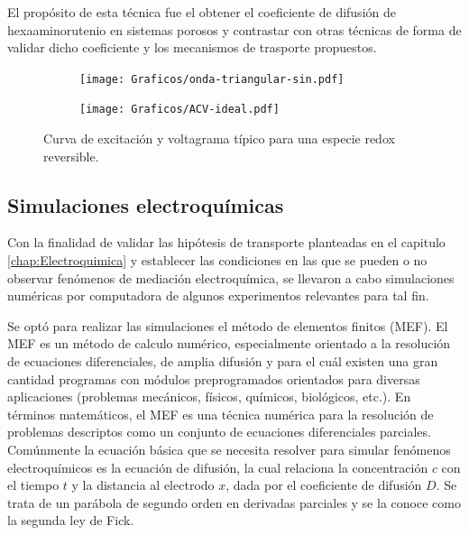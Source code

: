 	 		El propósito de esta técnica fue el obtener el coeficiente de difusión de hexaaminorutenio en sistemas porosos y contrastar con otras técnicas de forma de validar dicho coeficiente y los mecanismos de trasporte propuestos. 

	 			 \begin{figure}[hb!]
			  		  \begin{subfigure}[t]{0.495\textwidth}
			  		  \texttt{[image: Graficos/onda-triangular-sin.pdf]}
			  		  \end{subfigure}
			  		  \begin{subfigure}[t]{0.495\textwidth}
			  		  \texttt{[image: Graficos/ACV-ideal.pdf]}
			  		  \end{subfigure}
			  		  \caption[Voltamperometria ideal reversible]{Curva de excitación y voltagrama típico para una especie redox reversible.}
			  		  \label{fig:ACV_ideal}
			  		  \end{figure}
	 		
	 		
			
	 \subsection{Simulaciones electroquímicas}\label{simulacion}

	 	 Con la finalidad de validar las hipótesis de transporte planteadas en el capitulo \ref{chap:Electroquimica} y establecer las condiciones en las que se pueden o no observar fenómenos de mediación electroquímica, se llevaron a cabo simulaciones numéricas por computadora de algunos experimentos relevantes para tal fin.

	 	 Se optó para realizar las simulaciones el método de elementos finitos (MEF). El MEF es un método de calculo numérico, especialmente orientado a la resolución de ecuaciones diferenciales, de amplia difusión y para el cuál existen una gran cantidad programas con módulos preprogramados orientados para diversas aplicaciones (problemas mecánicos, físicos, químicos, biológicos, etc.). En términos matemáticos, el MEF es una técnica numérica para la resolución de problemas descriptos como un conjunto de ecuaciones diferenciales parciales. Comúnmente la ecuación básica que se necesita resolver para simular fenómenos electroquímicos es la ecuación de difusión, la cual relaciona la concentración $c$ con el tiempo $t$ y la distancia al electrodo $x$, dada por el coeficiente de difusión $D$.\cite{Britz2005,Nann2003} Se trata de un parábola de segundo orden en derivadas parciales y se la conoce como la segunda ley de Fick.\cite{fick1855}

